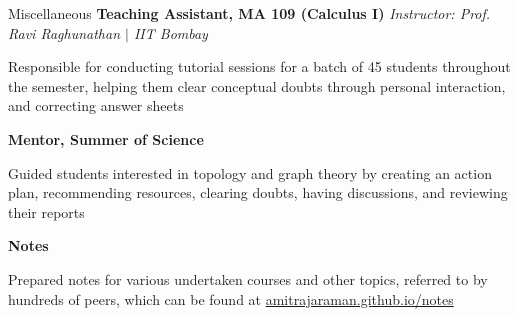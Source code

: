 
\begin{rubric}{Miscellaneous}
    \entry*[2020] \textbf{Teaching Assistant, MA 109 (Calculus I)} \hfill \emph{Instructor: Prof. Ravi Raghunathan $\mid$ IIT Bombay}
	    
	    Responsible for conducting tutorial sessions for a batch of 45 students throughout the semester, helping them clear conceptual doubts through personal interaction, and correcting answer sheets

	\entry*[2021--2022] \textbf{Mentor, Summer of Science}

		Guided students interested in topology and graph theory by creating an action plan, recommending resources, clearing doubts, having discussions, and reviewing their reports

	\entry*[2020--2022] \textbf{Notes}

		Prepared notes for various undertaken courses and other topics, referred to by hundreds of peers, which can be found at \href{https://amitrajaraman.github.io/notes}{amitrajaraman.github.io/notes}


\end{rubric}